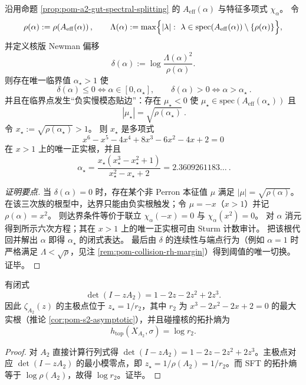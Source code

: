 \begin{proposition}\label{prop:pom-a2-gut-newman-threshold}
沿用命题 \ref{prop:pom-a2-gut-spectral-splitting} 的 \(A_{\mathrm{eff}}(\alpha)\) 与特征多项式 \(\chi_\alpha\)。
令
\[
\rho(\alpha):=\rho\!\left(A_{\mathrm{eff}}(\alpha)\right),\qquad
\Lambda(\alpha):=\max\Bigl\{|\lambda|:\ \lambda\in\mathrm{spec}(A_{\mathrm{eff}}(\alpha))\setminus\{\rho(\alpha)\}\Bigr\},
\]
并定义核版 Newman 偏移
\[
\delta(\alpha):=\log\frac{\Lambda(\alpha)^2}{\rho(\alpha)}.
\]
则存在唯一临界值 \(\alpha_\star>1\) 使
\[
\boxed{\ \delta(\alpha)\le 0\iff \alpha\in[0,\alpha_\star],\qquad \delta(\alpha)>0\iff \alpha>\alpha_\star\ }.
\]
并且在临界点发生“负实慢模态贴边”：存在 \(\mu_\star<0\) 使 \(\mu_\star\in\mathrm{spec}(A_{\mathrm{eff}}(\alpha_\star))\) 且
\[
\boxed{\ |\mu_\star|=\sqrt{\rho(\alpha_\star)}\ }.
\]
令 \(x_\star:=\sqrt{\rho(\alpha_\star)}>1\)。
则 \(x_\star\) 是多项式
\[
x^6-x^5-4x^4+8x^3-6x^2-4x+2=0
\]
在 \(x>1\) 上的唯一正实根，并且
\[
\boxed{\ \alpha_\star=\frac{x_\star(x_\star^3-x_\star^2+1)}{x_\star^2-x_\star+2}=2.3609261183\ldots\ }.
\]
\end{proposition}
\begin{proof}[证明要点]
当 \(\delta(\alpha)=0\) 时，存在某个非 Perron 本征值 \(\mu\) 满足 \(|\mu|=\sqrt{\rho(\alpha)}\)。
在该三次族的根型中，达界只能由负实根触发；令 \(\mu=-x\)（\(x>1\)）并记 \(\rho(\alpha)=x^2\)。
则达界条件等价于联立
\(
\chi_\alpha(-x)=0
\)
与
\(
\chi_\alpha(x^2)=0
\)。
对 \(\alpha\) 消元得到所示六次方程；其在 \(x>1\) 上的唯一正实根可由 Sturm 计数审计。
把该根代回并解出 \(\alpha\) 即得 \(\alpha_\star\) 的闭式表达。
最后由 \(\delta\) 的连续性与端点行为（例如 \(\alpha=1\) 时严格满足 \(\Lambda<\sqrt{\rho}\)，见注 \ref{rem:pom-collision-rh-margin}）得到阈值的唯一切换。证毕。
\end{proof}

\begin{proposition}[碰撞核的行列式与主极点]\label{prop:pom-collision-det}
有闭式
$$
\det(I-zA_2)=1-2z-2z^2+2z^3.
$$
因此 \(\zeta_{A_2}(z)\) 的主极点位于 \(z_\star=1/r_2\)，其中 \(r_2\) 为 \(x^3-2x^2-2x+2=0\) 的最大实根（推论 \ref{cor:pom-s2-asymptotic}），并且碰撞核的拓扑熵为
$$
h_{\mathrm{top}}(X_{A_2},\sigma)=\log r_2.
$$
\end{proposition}
\begin{proof}
对 \(A_2\) 直接计算行列式得 \(\det(I-zA_2)=1-2z-2z^2+2z^3\)。主极点对应 \(\det(I-zA_2)\) 的最小模零点，即 \(z_\star=1/\rho(A_2)=1/r_2\)。而 SFT 的拓扑熵等于 \(\log\rho(A_2)\)，故得 \(\log r_2\)。证毕。
\end{proof}

